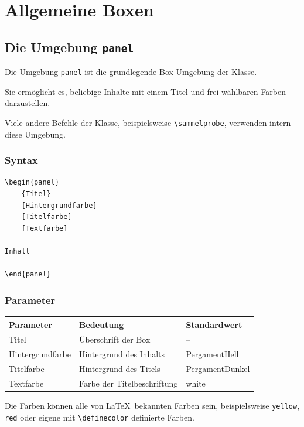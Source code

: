 \section{Allgemeine Boxen}

\subsection{Die Umgebung \texttt{panel}}

Die Umgebung \verb|panel| ist die grundlegende Box-Umgebung der Klasse.

Sie ermöglicht es, beliebige Inhalte mit einem Titel und frei wählbaren Farben darzustellen.

Viele andere Befehle der Klasse, beispielsweise \verb|\sammelprobe|, verwenden intern diese Umgebung.

\subsubsection*{Syntax}

\begin{Verbatim}
\begin{panel}
    {Titel}
    [Hintergrundfarbe]
    [Titelfarbe]
    [Textfarbe]

Inhalt

\end{panel}
\end{Verbatim}

\subsubsection*{Parameter}

\begin{center}
\begin{tabular}{|l|l|l|}
\hline
Parameter & Bedeutung & Standardwert\\
\hline
Titel & Überschrift der Box & --\\
\hline
Hintergrundfarbe & Hintergrund des Inhalts & PergamentHell\\
\hline
Titelfarbe & Hintergrund des Titels & PergamentDunkel\\
\hline
Textfarbe & Farbe der Titelbeschriftung & white\\
\hline
\end{tabular}
\end{center}

Die Farben können alle von \LaTeX\ bekannten Farben sein, beispielsweise
\verb|yellow|, \verb|red| oder eigene mit \verb|\definecolor| definierte Farben.

